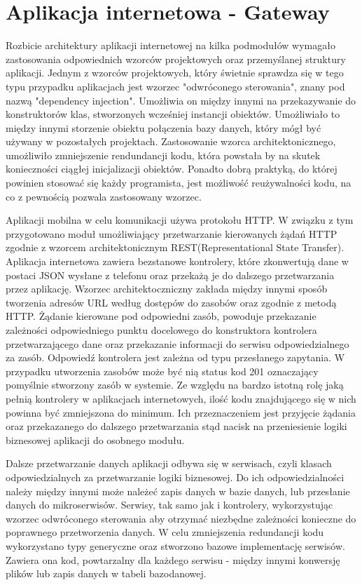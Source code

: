 	
\section{Aplikacja internetowa - Gateway}	
{	Rozbicie architektury aplikacji internetowej na kilka podmodułów wymagało zastosowania odpowiednich wzorców projektowych oraz przemyślanej struktury aplikacji. Jednym z wzorców projektowych, który świetnie sprawdza się w tego typu przypadku aplikacjach jest wzorzec "odwróconego sterowania", znany pod nazwą "dependency injection". Umożliwia on między innymi na przekazywanie do konstruktorów klas, stworzonych wcześniej instancji obiektów. Umożliwiało to między innymi storzenie obiektu połączenia bazy danych, który mógł być używany w pozostałych projektach. Zastosowanie wzorca architektonicznego, umożliwiło zmniejszenie rendundancji kodu, która powstała by na skutek konieczności ciągłej inicjalizacji obiektów. Ponadto dobrą praktyką, do której powinien stosować się każdy programista, jest możliwość reużywalności kodu, na co z pewnością pozwala zastosowany wzorzec. 

Aplikacji mobilna w celu komunikacji używa protokołu HTTP. W związku z tym 	 przygotowano moduł umożliwiający przetwarzanie kierowanych żądań HTTP zgodnie z wzorcem architektonicznym REST(Representational State Transfer). Aplikacja internetowa zawiera bezstanowe kontrolery, które zkonwertują dane w postaci JSON wysłane z telefonu oraz przekażą je do dalszego przetwarzania przez aplikację. Wzorzec architektoczniczny zakłada między innymi sposób tworzenia adresów URL według dostępów do zasobów oraz zgodnie z metodą HTTP. Żądanie kierowane pod odpowiedni zasób, powoduje przekazanie zależności odpowiedniego punktu docelowego do konstruktora kontrolera przetwarzającego dane oraz przekazanie informacji do serwisu odpowiedzialnego za zasób. Odpowiedź kontrolera jest zależna od typu przesłanego zapytania. W przypadku utworzenia zasobów może być nią status kod 201 oznaczający pomyślnie stworzony zasób w systemie. Ze względu na bardzo istotną rolę jaką pełnią kontrolery w aplikacjach internetowych, ilość kodu znajdującego się w nich powinna być zmniejszona do minimum. Ich przeznaczeniem jest przyjęcie żądania oraz przekazanego do dalszego przetwarzania stąd nacisk na przeniesienie logiki biznesowej aplikacji do osobnego modułu.

Dalsze przetwarzanie danych aplikacji odbywa się w serwisach, czyli klasach odpowiedzialnych za przetwarzanie logiki biznesowej. Do ich odpowiedzialności należy między innymi może należeć zapis danych w bazie danych, lub przesłanie danych do mikroserwisów. Serwisy, tak samo jak i kontrolery, wykorzystując wzorzec odwróconego sterowania aby otrzymać niezbędne zależności konieczne do poprawnego przetworzenia danych. W celu zmniejszenia redundancji kodu wykorzystano typy generyczne oraz stworzono bazowe implementację serwisów. Zawiera ona kod, powtarzalny dla każdego serwisu - między innymi konwersję plików lub zapis danych w tabeli bazodanowej. 

}
